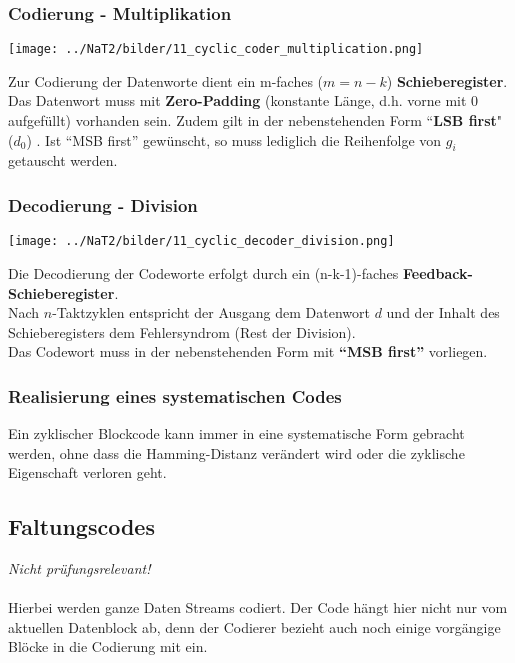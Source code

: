 \subsubsection{Codierung - Multiplikation }
\begin{minipage}{9cm}
	\texttt{[image: ../NaT2/bilder/11\_cyclic\_coder\_multiplication.png]}
\end{minipage}
\begin{minipage}{9.5cm}
	Zur Codierung der Datenworte dient ein m-faches ($m = n-k$) \textbf{Schieberegister}. \\
	Das Datenwort muss mit \textbf{Zero-Padding} (konstante Länge, d.h. vorne mit 0 aufgefüllt) vorhanden sein.
	Zudem gilt in der nebenstehenden Form ``\textbf{LSB first}" ($d_0$) . Ist ``MSB first'' gewünscht, so muss
	lediglich die Reihenfolge von $g_i$ getauscht werden.
\end{minipage}

\subsubsection{Decodierung - Division }
\begin{minipage}{9.4cm}
	\texttt{[image: ../NaT2/bilder/11\_cyclic\_decoder\_division.png]}
\end{minipage}
\begin{minipage}{9cm}
	Die Decodierung der Codeworte erfolgt durch ein (n-k-1)-faches \textbf{Feedback-Schieberegister}.\\
	Nach $n$-Taktzyklen entspricht der Ausgang dem Datenwort $d$ und der Inhalt des Schieberegisters
	dem Fehlersyndrom (Rest der Division). \\ 
	Das Codewort muss in der nebenstehenden Form mit \textbf{``MSB first''} vorliegen.
\end{minipage}


\subsubsection{Realisierung eines systematischen Codes}
Ein zyklischer Blockcode kann immer in eine systematische Form gebracht werden, ohne dass die
Hamming-Distanz verändert wird oder die zyklische Eigenschaft verloren geht.

\subsection{Faltungscodes }
\textit{Nicht prüfungsrelevant!}\\ \\
Hierbei werden ganze Daten Streams codiert. Der Code hängt hier nicht nur vom aktuellen Datenblock
ab, denn der Codierer bezieht auch noch einige vorgängige Blöcke in die Codierung mit ein.
